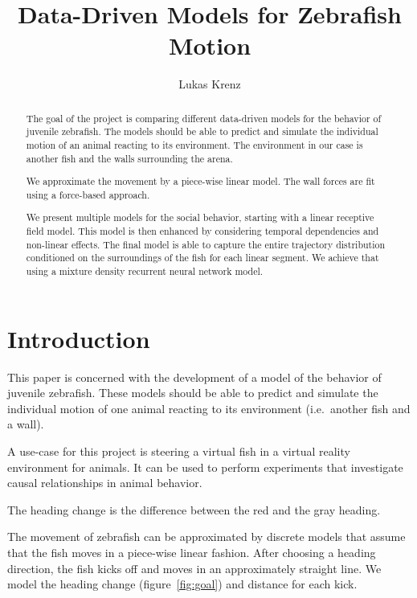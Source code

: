 \documentclass[nobib, a4paper]{tufte-handout}
\title{Data-Driven Models for Zebrafish Motion}
\author[Lukas Krenz]{Lukas Krenz}
\begin{document}
\maketitle%

\begin{abstract}
\noindent
The goal of the project is comparing different data-driven models for the behavior of juvenile zebrafish.
The models should be able to predict and simulate the individual motion of an animal reacting to its environment.
The environment in our case is another fish and the walls surrounding the arena.

We approximate the movement by a piece-wise linear model.
The wall forces are fit using a force-based approach.

We present multiple models for the social behavior, starting with a linear receptive field model.
This model is then enhanced by considering temporal dependencies and non-linear effects.
The final model is able to capture the entire trajectory distribution conditioned on the surroundings of the fish for each linear segment.
We achieve that using a mixture density recurrent neural network model.
\end{abstract}

\section{Introduction}
This paper is concerned with the development of a model of the behavior of juvenile zebrafish.
These models should be able to predict and simulate the individual motion of one animal reacting to its environment (i.e.\ another fish and a wall).

A use-case for this project is steering a virtual fish in a virtual reality environment for animals.
It can be used to perform experiments that investigate causal relationships in animal behavior.

\begin{marginfigure}
    \centering
{} 
\caption{The heading change is the difference between the red and the gray heading.}
\label{fig:goal}
\end{marginfigure}
The movement of zebrafish can be approximated by discrete models that assume that the fish moves in a piece-wise linear fashion.
After choosing a heading direction, the fish kicks off and moves in an approximately straight line.
We model the heading change (figure~\ref{fig:goal}) and distance for each kick.
\end{document}
